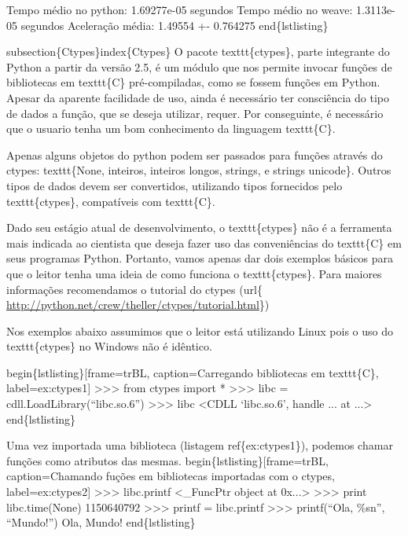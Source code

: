\documentclass[a4paper,10pt,brazil]{sphinxmanual}
\begin{document}
Tempo médio no python: 1.69277e-05 segundos
Tempo médio no weave: 1.3113e-05 segundos
Aceleração média: 1.49554 +- 0.764275
end\{lstlisting\}

subsection\{Ctypes\}index\{Ctypes\}
O pacote texttt\{ctypes\}, parte integrante do Python a partir da versão 2.5, é um módulo que nos permite invocar funções de bibliotecas em texttt\{C\} pré-compiladas, como se fossem funções em Python.  Apesar da aparente facilidade de uso, ainda é necessário ter consciência do tipo de dados a função, que se deseja utilizar, requer. Por conseguinte, é necessário que o usuario tenha um bom conhecimento da linguagem texttt\{C\}.

Apenas alguns objetos do python podem ser passados para funções através do ctypes: texttt\{None, inteiros, inteiros longos, strings, e strings unicode\}. Outros tipos de dados devem ser convertidos, utilizando tipos fornecidos pelo texttt\{ctypes\}, compatíveis com texttt\{C\}.

Dado seu estágio atual de desenvolvimento, o texttt\{ctypes\} não é a ferramenta mais indicada ao cientista que deseja fazer uso das conveniências do texttt\{C\} em seus programas Python. Portanto, vamos apenas dar dois exemplos básicos para que o leitor tenha uma ideia de como funciona o texttt\{ctypes\}. Para maiores informações recomendamos o tutorial do ctypes (url\{ \href{http://python.net/crew/theller/ctypes/tutorial.html}{http://python.net/crew/theller/ctypes/tutorial.html}\})

Nos exemplos abaixo assumimos que o leitor está utilizando Linux pois o uso do texttt\{ctypes\} no Windows não é idêntico.

begin\{lstlisting\}{[}frame=trBL, caption=Carregando bibliotecas em texttt\{C\}, label=ex:ctypes1{]}
\textgreater{}\textgreater{}\textgreater{} from ctypes import *
\textgreater{}\textgreater{}\textgreater{} libc = cdll.LoadLibrary(``libc.so.6'')
\textgreater{}\textgreater{}\textgreater{} libc
\textless{}CDLL `libc.so.6', handle ... at ...\textgreater{}
end\{lstlisting\}

Uma vez importada uma biblioteca (listagem ref\{ex:ctypes1\}), podemos chamar funções como atributos das mesmas.
begin\{lstlisting\}{[}frame=trBL, caption=Chamando fuções em bibliotecas importadas com o ctypes, label=ex:ctypes2{]}
\textgreater{}\textgreater{}\textgreater{} libc.printf
\textless{}\_FuncPtr object at 0x...\textgreater{}
\textgreater{}\textgreater{}\textgreater{} print libc.time(None)
1150640792
\textgreater{}\textgreater{}\textgreater{} printf = libc.printf
\textgreater{}\textgreater{}\textgreater{} printf(``Ola, \%sn'', ``Mundo!'')
Ola, Mundo!
end\{lstlisting\}
\end{document}

